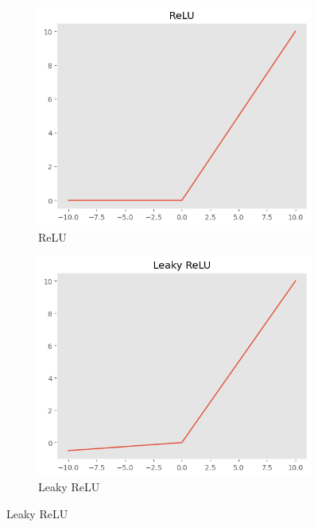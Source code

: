 \begin{figure}[!ht]
    \centering
    \begin{subfigure}[b]{0.3\textwidth}
        \centering
        \includegraphics[width=\textwidth]{img/rete/relu.png}
        \caption{ReLU}
        \label{fig:relu}
    \end{subfigure}
    \hfill
    \begin{subfigure}[b]{0.3\textwidth}
        \centering
        \includegraphics[width=\textwidth]{img/rete/leaky_relu.png}
        \caption{Leaky ReLU}
        \label{fig:leaky-relu}
    \end{subfigure}

\end{figure}
